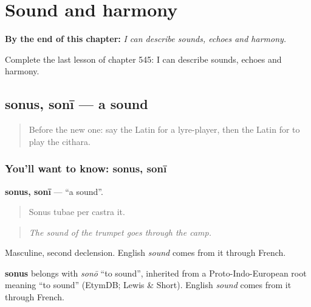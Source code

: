 
\chapter{Sound and harmony}
\label{ch:la-sound-and-harmony}

\begin{chapteropening}
\textbf{By the end of this chapter:} \emph{I can describe sounds, echoes and harmony.}

Complete the last lesson of chapter 545: I can describe sounds, echoes and harmony.
\end{chapteropening}

\section[sonus, sonī]{sonus, sonī — a sound}

\label{lesson:LA-C545-sonus}



\begin{quote}
Before the new one: say the Latin for a lyre-player, then the Latin for to play the cithara.
\end{quote}

\subsection*{You'll want to know: sonus, sonī}
\textbf{sonus, sonī} — \textquotedblleft{}a sound\textquotedblright{}.

\begin{quote}
Sonus tubae per castra it.
\end{quote}

\begin{quote}
\emph{The sound of the trumpet goes through the camp.}
\end{quote}

Masculine, second declension. English \emph{sound} comes from it through French.

\begin{cousinweb}
\textbf{sonus} belongs with \emph{sonō} \textquotedblleft{}to sound\textquotedblright{}, inherited from a Proto-Indo-European root meaning \textquotedblleft{}to sound\textquotedblright{} (EtymDB; Lewis \& Short). English \emph{sound} comes from it through French.
\end{cousinweb}

